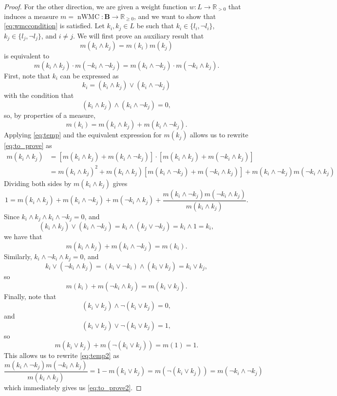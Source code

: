 \documentclass{article}
\theoremstyle{definition}
\theoremstyle{remark}
\DeclareMathOperator{\nWMC}{nWMC}
\begin{document}
\begin{proof}
  For the other direction, we are given a weight function $w\colon L \to
  \mathbb{R}_{>0}$ that induces a measure $m = \nWMC\colon \mathbf{B} \to
  \mathbb{R}_{\ge 0}$, and we want to show that \cref{eq:wmccondition} is
  satisfied. Let $k_i, k_j \in L$ be such that $k_i \in \{ l_i, \neg l_i \}$,
  $k_j \in \{ l_j, \neg l_j \}$, and $i \ne j$. We will first prove an auxiliary
  result that
  \begin{equation} \label{eq:to_prove}
    m(k_i \land k_j) = m(k_i)m(k_j)
  \end{equation}
  is equivalent to
  \begin{equation} \label{eq:to_prove2}
    m(k_i \land k_j) \cdot m(\neg k_i \land \neg k_j) = m(k_i \land \neg k_j)
    \cdot m(\neg k_i \land k_j).
  \end{equation}
  First, note that $k_i$ can be expressed as
  \[
    k_i = (k_i \land k_j) \lor (k_i \land \neg k_j)
  \]
  with the condition that
  \[
    (k_i \land k_j) \land (k_i \land \neg k_j) = 0,
  \]
  so, by properties of a measure,
  \begin{equation} \label{eq:temp}
    m(k_i) = m(k_i \land k_j) + m(k_i \land \neg k_j).
  \end{equation}
  Applying \cref{eq:temp} and the equivalent expression for $m(k_j)$ allows us
  to rewrite \cref{eq:to_prove} as
  \begin{align*}
    m(k_i \land k_j) &= [m(k_i \land k_j) + m(k_i \land \neg k_j)] \cdot [m(k_i \land k_j) + m(\neg k_i \land k_j)] \\
                     &= m(k_i \land k_j)^2 + m(k_i \land k_j)[m(k_i \land \neg k_j) + m(\neg k_i \land k_j)] + m(k_i \land \neg k_j)m(\neg k_i \land k_j)
  \end{align*}
  Dividing both sides by $m(k_i \land k_j)$ gives
  \begin{equation} \label{eq:temp2}
    1 = m(k_i \land k_j) + m(k_i \land \neg k_j) + m(\neg k_i \land k_j) +
    \frac{m(k_i \land \neg k_j)m(\neg k_i \land k_j)}{m(k_i \land k_j)}.
  \end{equation}
  Since $k_i \land k_j \land k_i \land \neg k_j = 0$, and
  \[
    (k_i \land k_j) \lor (k_i \land \neg k_j) = k_i \land (k_j \lor \neg k_j) =
    k_i \land 1 = k_i,
  \]
  we have that
  \[
    m(k_i \land k_j) + m(k_i \land \neg k_j) = m(k_i).
  \]
  Similarly, $k_i \land \neg k_i \land k_j = 0$, and
  \[
    k_i \lor (\neg k_i \land k_j) = (k_i \lor \neg k_i) \land (k_i \lor k_j) =
    k_i \lor k_j,
  \]
  so
  \[
    m(k_i) + m(\neg k_i \land k_j) = m(k_i \lor k_j).
  \]
  Finally, note that
  \[
    (k_i \lor k_j) \land \neg(k_i \lor k_j) = 0,
  \]
  and
  \[
    (k_i \lor k_j) \lor \neg(k_i \lor k_j) = 1,
  \]
  so
  \[
    m(k_i \lor k_j) + m(\neg(k_i \lor k_j)) = m(1) = 1.
  \]
  This allows us to rewrite \cref{eq:temp2} as
  \[
    \frac{m(k_i \land \neg k_j)m(\neg k_i \land k_j)}{m(k_i \land k_j)} = 1 -
    m(k_i \lor k_j) = m(\neg(k_i \lor k_j)) = m(\neg k_i \land \neg k_j)
  \]
  which immediately gives us \cref{eq:to_prove2}.


\end{proof}
\end{document}
